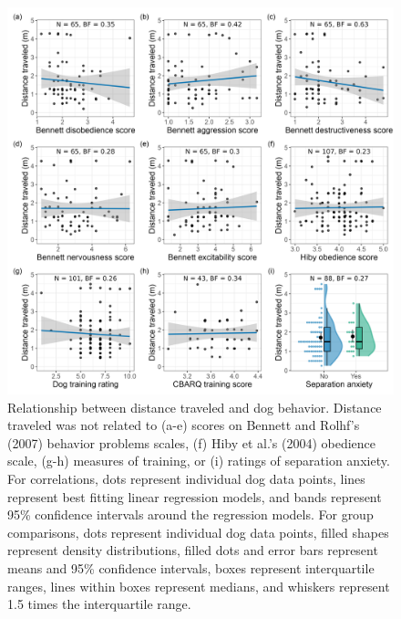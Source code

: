 \documentclass[
  pub,floatsintext]{apa6}
\begin{document}
\begin{figure}

{\centering \includegraphics[width=0.95\linewidth]{figures/dog_behavior} 

}

\caption{Relationship between distance traveled and dog behavior. Distance traveled was not related to (a-e) scores on Bennett and Rolhf's (2007) behavior problems scales, (f) Hiby et al.'s (2004) obedience scale, (g-h) measures of training, or (i) ratings of separation anxiety. For correlations, dots represent individual dog data points, lines represent best fitting linear regression models, and bands represent 95\% confidence intervals around the regression models. For group comparisons, dots represent individual dog data points, filled shapes represent density distributions, filled dots and error bars represent means and 95\% confidence intervals, boxes represent interquartile ranges, lines within boxes represent medians, and whiskers represent 1.5 times the interquartile range. }\label{fig:dog-behavior}
\end{figure}
\end{document}
